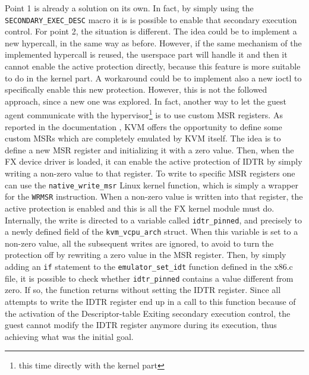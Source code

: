 Point 1 is already a solution on its own. In fact, by simply using the \texttt{SECONDARY\_EXEC\_DESC} macro it is is possible to enable that secondary execution control. For point 2, the situation is different. The idea could be to implement a new hypercall, in the same way as before. However, if the same mechanism of the implemented hypercall is reused, the userspace part will handle it and then it cannot enable the active protection directly, because this feature is more suitable to do in the kernel part. A workaround could be to implement also a new ioctl to specifically enable this new protection. However, this is not the followed approach, since a new one was explored. In fact, another way to let the guest agent communicate with the hypervisor\footnote{this time directly with the kernel part} is to use custom MSR registers. As reported in the documentation \cite{kvm-msr}, KVM offers the opportunity to define some custom MSRs which are completely emulated by KVM itself. The idea is to define a new MSR register and initializing it with a zero value. Then, when the FX device driver is loaded, it can enable the active protection of IDTR by simply writing a non-zero value to that register. To write to specific MSR registers one can use the \texttt{native\_write\_msr} Linux kernel function, which is simply a wrapper for the \texttt{WRMSR} instruction. When a non-zero value is written into that register, the active protection is enabled and this is all the FX kernel module must do. Internally, the write is directed to a variable called \texttt{idtr\_pinned}, and precisely to a newly defined field of the \texttt{kvm\_vcpu\_arch} struct. When this variable is set to a non-zero value, all the subsequent writes are ignored, to avoid to turn the protection off by rewriting a zero value in the MSR register. Then, by simply adding an \texttt{if} statement to the \texttt{emulator\_set\_idt} function defined in the x86.c file, it is possible to check whether \texttt{idtr\_pinned} contains a value different from zero. If so, the function returns without setting the IDTR register. Since all attempts to write the IDTR register end up in a call to this function because of the activation of the Descriptor-table Exiting secondary execution control, the guest cannot modify the IDTR register anymore during its execution, thus achieving what was the initial goal.
\par 
